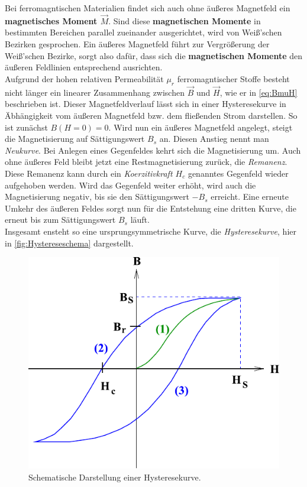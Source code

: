 Bei ferromagntischen Materialien findet sich auch ohne äußeres Magnetfeld ein \textbf{magnetisches Moment $\vec{M}$}. Sind diese \textbf{magnetischen Momente} in bestimmten Bereichen parallel zueinander ausgerichtet, wird
von Weiß'schen Bezirken gesprochen. Ein äußeres Magnetfeld führt zur Vergrößerung der Weiß'schen Bezirke, sorgt also dafür, dass sich die \textbf{magnetischen Momente} den äußeren Feldlinien entsprechend ausrichten.\\

Aufgrund der hohen relativen Permeabilität $μ_r$ ferromagntischer Stoffe besteht nicht länger ein linearer Zusammenhang zwischen $\vec{B}$ und $\vec{H}$, wie er in \eqref{eq:BmuH} beschrieben ist.
Dieser Magnetfeldverlauf lässt sich in einer Hysteresekurve in Äbhängigkeit vom äußeren Magnetfeld bzw. dem fließenden Strom darstellen. So ist zunächst $B(H=0)=0$. Wird nun ein äußeres Magnetfeld angelegt, steigt die Magnetisierung
auf Sättigungswert $B_s$ an. Diesen Anstieg nennt man \textit{Neukurve}. Bei Anlegen eines Gegenfeldes kehrt sich die Magnetisierung um. Auch ohne äußeres Feld bleibt jetzt eine Restmagnetisierung zurück, die \textit{Remanenz}.
Diese Remanenz kann durch ein \textit{Koerzitivkraft $H_c$} genanntes Gegenfeld wieder aufgehoben werden.
Wird das Gegenfeld weiter erhöht, wird auch die Magnetisierung negativ, bis sie den Sättigungswert $-B_s$ erreicht. Eine erneute Umkehr des äußeren Feldes sorgt nun für die Entstehung eine dritten Kurve,
die erneut bis zum Sättigungswert $B_s$ läuft.\\
 
Insgesamt ensteht so eine ursprungsymmetrische Kurve, die \textit{Hysteresekurve}, hier in \autoref{fig:Hystereseschema} dargestellt.

\begin{figure}[H]
    \centering
    \includegraphics{Hystereseschema.pdf}
    \caption{Schematische Darstellung einer Hysteresekurve\cite{ap03}.}
    \label{fig:Hystereseschema}
  \end{figure}



